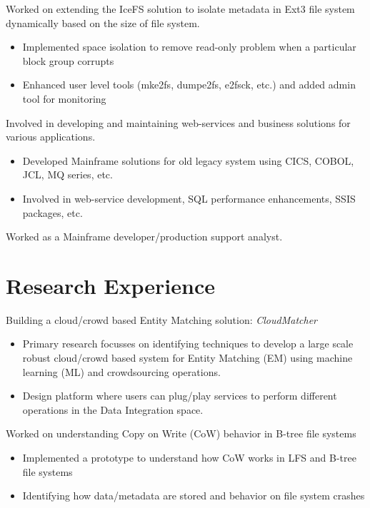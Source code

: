 \documentclass{resume}
\begin{document}
Worked on extending the IceFS solution to isolate metadata in Ext3 file system dynamically based on the size of file system.
\begin{itemize}
  \item Implemented space isolation to remove read-only problem when a particular block group corrupts
  \item Enhanced user level tools (mke2fs, dumpe2fs, e2fsck, etc.) and added admin tool for monitoring
\end{itemize}

Involved in developing and maintaining web-services and business solutions for various applications.
\begin{itemize}
  \item Developed Mainframe solutions for old legacy system using CICS, COBOL, JCL, MQ series, etc.
  \item Involved in web-service development, SQL performance enhancements, SSIS packages, etc.
\end{itemize}

Worked as a Mainframe developer/production support analyst.

\section{Research Experience}
Building a cloud/crowd based Entity Matching solution: \textit{CloudMatcher}
\begin{itemize}
  \item Primary research focusses on identifying techniques to develop a large scale robust cloud/crowd based system for Entity Matching (EM) using machine learning (ML)
and crowdsourcing operations.
  \item Design platform where users can plug/play services to perform different operations in the Data Integration space.
\end{itemize}

Worked on understanding Copy on Write (CoW) behavior in B-tree file systems 
\begin{itemize}
  \item Implemented a prototype to understand how CoW works in LFS and B-tree file systems
  \item Identifying how data/metadata are stored and behavior on file system crashes
\end{itemize}
\end{document}
